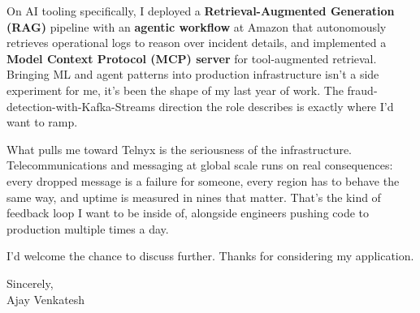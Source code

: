\documentclass[letterpaper,11pt]{article}
\begin{document}
On AI tooling specifically, I deployed a \textbf{Retrieval-Augmented Generation (RAG)} pipeline with an \textbf{agentic workflow} at Amazon that autonomously retrieves operational logs to reason over incident details, and implemented a \textbf{Model Context Protocol (MCP) server} for tool-augmented retrieval. Bringing ML and agent patterns into production infrastructure isn't a side experiment for me, it's been the shape of my last year of work. The fraud-detection-with-Kafka-Streams direction the role describes is exactly where I'd want to ramp.

What pulls me toward Telnyx is the seriousness of the infrastructure. Telecommunications and messaging at global scale runs on real consequences: every dropped message is a failure for someone, every region has to behave the same way, and uptime is measured in nines that matter. That's the kind of feedback loop I want to be inside of, alongside engineers pushing code to production multiple times a day.

I'd welcome the chance to discuss further. Thanks for considering my application.

\vspace{12pt}

Sincerely, \\
Ajay Venkatesh
\end{document}
